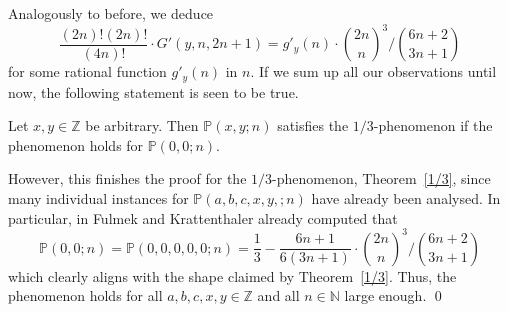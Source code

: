 \documentclass{amsart}
\numberwithin{equation}{section}
\newcommand*{\N}{\mathbb{N}}
\newcommand*{\Z}{\mathbb{Z}}
\begin{document}
Analogously to before, we deduce
\[\frac{(2n)!(2n)!}{(4n)!}\cdot G'(y,n,2n+1)=g'_{y}(n)\cdot \binom{2n}{n}^3\bigg/\binom{6n+2}{3n+1}\]
for some rational function $g'_y(n)$ in $n$. If we sum up all our observations until now, the following statement is seen to be true.
\begin{cor}
    Let $x,y\in \Z$ be arbitrary. Then $\mathbb{P}(x,y;n)$ satisfies the $1/3$-phenomenon if the phenomenon holds for $\mathbb{P}(0,0;n)$.
\end{cor}

However, this finishes the proof for the $1/3$-phenomenon, Theorem~\ref{1/3}, since many individual instances for $\mathbb{P}(a,b,c,x,y,;n)$ have already been analysed. In particular, in \cite[Cor. 7 (1.8)]{CenterCase} Fulmek and Krattenthaler already computed that
\[\mathbb{P}(0,0;n)=\mathbb{P}(0,0,0,0,0;n)=\frac{1}{3}-\frac{6n+1}{6(3n+1)}\cdot \binom{2n}{n}^3\Big/\binom{6n+2}{3n+1}\]
which clearly aligns with the shape claimed by Theorem~\ref{1/3}. Thus, the phenomenon holds for all $a,b,c,x,y\in \Z$ and all $n\in\N$ large enough. \qed




   
\newpage



\end{document}
